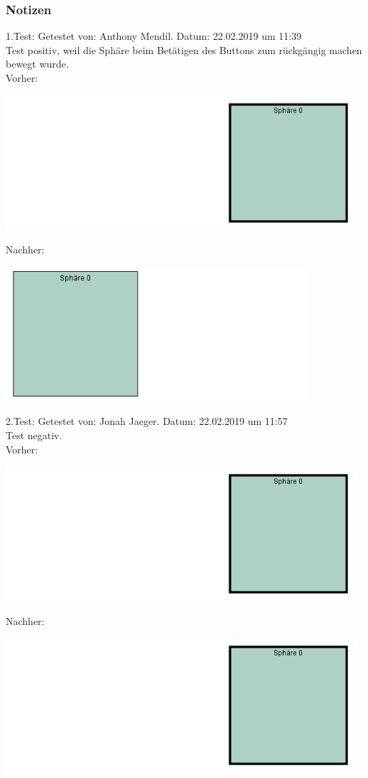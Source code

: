 \documentclass[enabledeprecatedfontcommands]{scrartcl}
\begin{document}
\subsubsection{Notizen}
1.Test: Getestet von: Anthony Mendil. Datum: 22.02.2019 um 11:39 \\
Test positiv, weil die Sphäre beim Betätigen des Buttons zum rückgängig machen bewegt wurde. \\
Vorher: 
\begin{center}
\includegraphics[height=5cm]{2_1vorher.PNG}
\end{center}
Nachher: 
\begin{center}
\includegraphics[height=5cm]{2_1nachher.PNG}
\end{center}
2.Test: Getestet von: Jonah Jaeger. Datum: 22.02.2019 um 11:57 \\
Test negativ. \\
Vorher: 
\begin{center}
\includegraphics[height=5cm]{2_1vorher.PNG}
\end{center}
Nachher: 
\begin{center}
\includegraphics[height=5cm]{2_1vorher.PNG}
\end{center}
\end{document}
